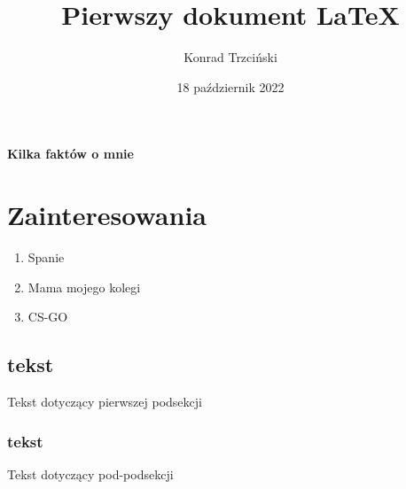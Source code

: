 \documentclass[12pt, letterpaper, titlepage]{article}
\title{Pierwszy dokument LaTeX}
\author{Konrad Trzciński}
\date{18 październik 2022}
\begin{document}
\maketitle
\begin{center}

\textbf{Kilka faktów o mnie}

\end{center}

\section{Zainteresowania}
\begin{enumerate}[-]
\item Spanie
\item Mama mojego kolegi
\item CS-GO
\end{enumerate}
\subsection{tekst}
Tekst dotyczący pierwszej podsekcji
\subsubsection{tekst}
Tekst dotyczący pod-podsekcji

\newpage
\end{document}
